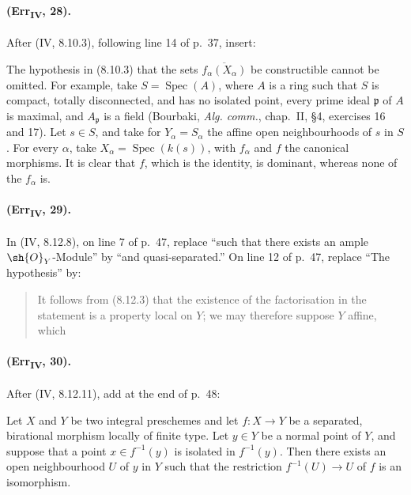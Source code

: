 \paragraph{(Err\textsubscript{IV}, 28).}
After (IV, 8.10.3), following line 14 of p.~37, insert:

\begin{remark}[8.10.3.1]
The hypothesis in (8.10.3) that the sets
$\overline{f_\alpha(X_\alpha)}$ be constructible cannot be omitted.
For example, take $S=\operatorname{Spec}(A)$, where $A$ is a ring such
that $S$ is compact, totally disconnected, and has no isolated point,
every prime ideal $\mathfrak p$ of $A$ is maximal, and $A_\mathfrak p$
is a field (Bourbaki, \emph{Alg. comm.}, chap.~II, \S4,
exercises 16 and 17).  Let $s\in S$, and take for
$Y_\alpha=S_\alpha$ the affine open neighbourhoods of $s$ in $S$.
For every $\alpha$, take $X_\alpha=\operatorname{Spec}(k(s))$, with
$f_\alpha$ and $f$ the canonical morphisms.  It is clear that $f$,
which is the identity, is dominant, whereas none of the $f_\alpha$ is.
\end{remark}

\paragraph{(Err\textsubscript{IV}, 29).}
In (IV, 8.12.8), on line 7 of p.~47, replace ``such that there exists an
ample $\sh{O}_Y$-Module'' by ``and quasi-separated.''  On line 12 of
p.~47, replace ``The hypothesis'' by:
\begin{quote}
It follows from (8.12.3) that the existence of the factorisation in the
statement is a property local on $Y$; we may therefore suppose $Y$
affine, which
\end{quote}

\paragraph{(Err\textsubscript{IV}, 30).}
After (IV, 8.12.11), add at the end of p.~48:

\begin{corollary}[8.12.12]
Let $X$ and $Y$ be two integral preschemes and let $f:X\to Y$ be a
separated, birational morphism locally of finite type.  Let $y\in Y$ be
a normal point of $Y$, and suppose that a point $x\in f^{-1}(y)$ is
isolated in $f^{-1}(y)$.  Then there exists an open neighbourhood $U$
of $y$ in $Y$ such that the restriction $f^{-1}(U)\to U$ of $f$ is an
isomorphism.
\end{corollary}

